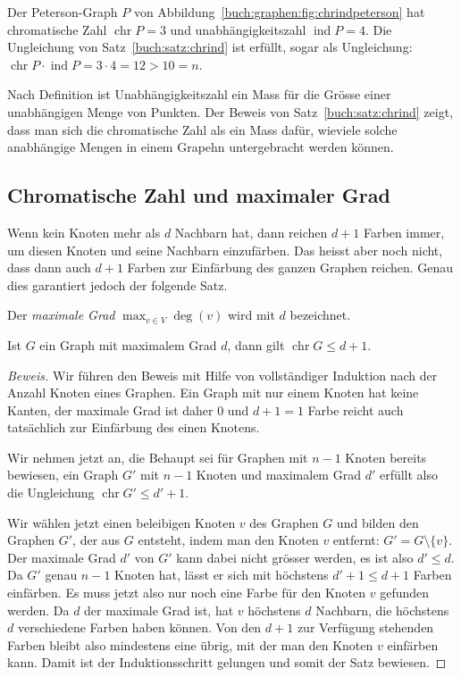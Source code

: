 \begin{beispiel}
Der Peterson-Graph $P$ von Abbildung~\ref{buch:graphen:fig:chrindpeterson}
hat chromatische Zahl $\operatorname{chr}P=3$ und unabhängigkeitszahl
$\operatorname{ind}P=4$.
Die Ungleichung von Satz~\ref{buch:satz:chrind} ist erfüllt, sogar als
Ungleichung: $\operatorname{chr}P\cdot\operatorname{ind}P=3\cdot 4=12>10=n$.
\end{beispiel}

Nach Definition ist Unabhängigkeitszahl ein Mass für die Grösse einer
unabhängigen Menge von Punkten.
Der Beweis von Satz~\ref{buch:satz:chrind} zeigt, dass man sich die
chromatische Zahl als ein Mass dafür, wieviele solche anabhängige 
Mengen in einem Grapehn untergebracht werden können.

%
%
\subsection{Chromatische Zahl und maximaler Grad
\label{buch:subsection:chr-und-maximaler-grad}}
Wenn kein Knoten mehr als $d$ Nachbarn hat, dann reichen
$d+1$ Farben immer, um diesen Knoten und seine Nachbarn einzufärben.
Das heisst aber noch nicht, dass dann auch $d+1$ Farben zur
Einfärbung des ganzen Graphen reichen.
Genau dies garantiert jedoch der folgende Satz.

\begin{definition}
Der {\em maximale Grad} 
\(
\max_{v\in V} \deg(v)
\)
wird mit $d$ bezeichnet.
\end{definition}

\begin{satz}
\label{buch:graphen:satz:chrmaxgrad}
Ist $G$ ein Graph mit maximalem Grad $d$, dann gilt 
$\operatorname{chr}G \le d+1$.
\end{satz}

\begin{proof}[Beweis]
Wir führen den Beweis mit Hilfe von vollständiger Induktion nach der
Anzahl Knoten eines Graphen.
Ein Graph mit nur einem Knoten hat keine Kanten, der maximale Grad ist
daher $0$ und $d+1=1$ Farbe reicht auch tatsächlich zur Einfärbung des
einen Knotens.

Wir nehmen jetzt an, die Behaupt sei für Graphen mit $n-1$ Knoten bereits
bewiesen, ein Graph $G'$ mit $n-1$ Knoten und maximalem Grad $d'$ erfüllt
also die Ungleichung $\operatorname{chr}G'\le d'+1$.

Wir wählen jetzt einen beleibigen Knoten $v$ des Graphen $G$ und bilden
den Graphen $G'$, der aus $G$ entsteht, indem man den Knoten $v$
entfernt: $G'=G\setminus\{v\}$.
Der maximale Grad $d'$ von $G'$ kann dabei nicht grösser werden, es ist
also $d'\le d$.
Da $G'$ genau $n-1$ Knoten hat, lässt er sich mit höchstens $d'+1\le d+1$
Farben einfärben.
Es muss jetzt also nur noch eine Farbe für den Knoten $v$ gefunden werden.
Da $d$ der maximale Grad ist, hat $v$ höchstens $d$ Nachbarn, die höchstens
$d$ verschiedene Farben haben können.
Von den $d+1$ zur Verfügung stehenden Farben bleibt also mindestens eine
übrig, mit der man den Knoten $v$ einfärben kann.
Damit ist der Induktionsschritt gelungen und somit der Satz bewiesen.
\end{proof}


